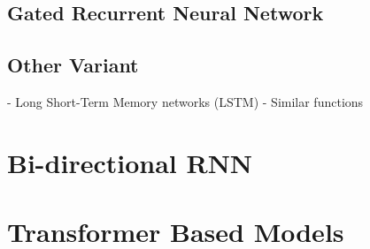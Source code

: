 			\subsection{Gated Recurrent Neural Network}

			\subsection{Other Variant}

				- Long Short-Term Memory networks (LSTM)
				- Similar functions
		\section{Bi-directional RNN}

		\section{Transformer Based Models}





		

